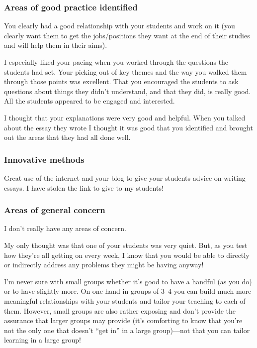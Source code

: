 \subsubsection{Areas of good practice identified}\label{sec:A-good}

You clearly had a good relationship with your students and work on it (you clearly want them to get the jobs/positions they want at the end of their studies and will help them in their aims). 

I especially liked your pacing when you worked through the questions the students had set. Your picking out of key themes and the way you walked them through those points was excellent. That you encouraged the students to ask questions about things they didn't understand, and that they did, is really good. All the students appeared to be engaged and interested.

I thought that your explanations were very good and helpful. When you talked about the essay they wrote I thought it was good that you identified and brought out the areas that they had all done well. 

\subsubsection{Innovative methods}\label{sec:A-innovative}

Great use of the internet and your blog to give your students advice on writing essays. I have stolen the link to give to my students! 

\subsubsection{Areas of general concern}\label{sec:A-concern}

I don't really have any areas of concern.

My only thought was that one of your students was very quiet. But, as you test how they're all getting on every week, I know that you would be able to directly or indirectly address any problems they might be having anyway!

I'm never sure with small groups whether it's good to have a handful (as you do) or to have slightly more. On one hand in groups of 3--4 you can build much more meaningful relationships with your students and tailor your teaching to each of them. However, small groups are also rather exposing and don't provide the assurance that larger groups may provide (it's comforting to know that you're not the only one that doesn't ``get in'' in a large group)---not that you can tailor learning in a large group! 

